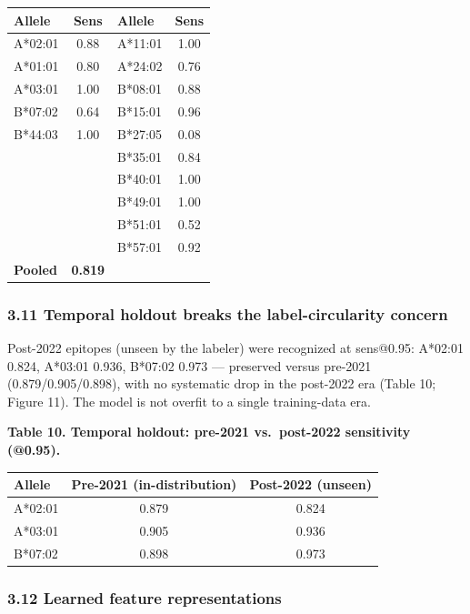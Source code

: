 \documentclass[10pt]{article}
\newcounter{none} %
\begin{document}
{\def\LTcaptype{none} %
\begin{longtable}[]{@{}lclc@{}}
\toprule\noalign{}
Allele & Sens & Allele & Sens \\
\midrule\noalign{}
\endhead
\bottomrule\noalign{}
\endlastfoot
A*02:01 & 0.88 & A*11:01 & 1.00 \\
A*01:01 & 0.80 & A*24:02 & 0.76 \\
A*03:01 & 1.00 & B*08:01 & 0.88 \\
B*07:02 & 0.64 & B*15:01 & 0.96 \\
B*44:03 & 1.00 & B*27:05 & 0.08 \\
& & B*35:01 & 0.84 \\
& & B*40:01 & 1.00 \\
& & B*49:01 & 1.00 \\
& & B*51:01 & 0.52 \\
& & B*57:01 & 0.92 \\
\textbf{Pooled} & \textbf{0.819} & & \\
\end{longtable}
}

\subsubsection{3.11 Temporal holdout breaks the label-circularity
concern}\label{temporal-holdout-breaks-the-label-circularity-concern}

Post-2022 epitopes (unseen by the labeler) were recognized at sens@0.95:
A*02:01 0.824, A*03:01 0.936, B*07:02 0.973 --- preserved versus
pre-2021 (0.879/0.905/0.898), with no systematic drop in the post-2022
era (Table 10; Figure 11). The model is not overfit to a single
training-data era.

\textbf{Table 10. Temporal holdout: pre-2021 vs.~post-2022 sensitivity
(@0.95).}

{\def\LTcaptype{none} %
\begin{longtable}[]{@{}lcc@{}}
\toprule\noalign{}
Allele & Pre-2021 (in-distribution) & Post-2022 (unseen) \\
\midrule\noalign{}
\endhead
\bottomrule\noalign{}
\endlastfoot
A*02:01 & 0.879 & 0.824 \\
A*03:01 & 0.905 & 0.936 \\
B*07:02 & 0.898 & 0.973 \\
\end{longtable}
}

\subsubsection{3.12 Learned feature
representations}\label{learned-feature-representations}
\end{document}
